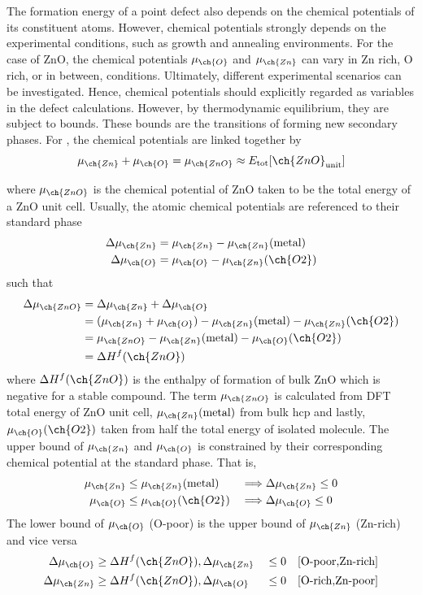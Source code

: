 The formation energy of a point defect also depends on the chemical potentials of its constituent atoms. However, chemical potentials strongly depends on the experimental conditions, such as growth and annealing environments. For the case of ZnO, the chemical potentials $\mu_{\ch{O}}$ and $\mu_{\ch{Zn}}$ can vary in Zn rich, O rich, or in between, conditions. Ultimately, different experimental scenarios can be investigated. Hence, chemical potentials should explicitly regarded as variables in the defect calculations.  However, by thermodynamic equilibrium, they are subject to bounds. These bounds are the transitions of forming new secondary phases. For , the chemical potentials are linked together by \citep{Freysoldt2014}
\begin{equation}
    \mu_{\ch{Zn}} +    \mu_{\ch{O}} =     \mu_{\ch{ZnO}} \approx E_{\text{tot}}[\ch{ZnO}_{\text{unit}}]
\end{equation}

where $\mu_{\ch{ZnO}}$ is the chemical potential of ZnO taken to be the total energy of a ZnO unit cell. Usually, the atomic chemical potentials are referenced to their standard phase
\begin{align}
    \Delta \mu_{\ch{Zn}} &= \mu_{\ch{Zn}} - \mu_{\ch{Zn}}(\text{metal}) \label{eq:del-mu_Zn} \\
    \Delta \mu_{\ch{O}}  &= \mu_{\ch{O}} - \mu_{\ch{Zn}}(\ch{O2}) \label{eq:del-mu_O}
\end{align}
such that 
\begin{align}
    \Delta \mu_{\ch{ZnO}} &= \Delta \mu_{\ch{Zn}} +   \Delta \mu_{\ch{O}} \\
    &= (\mu_{\ch{Zn}} + \mu_{\ch{O}}) - \mu_{\ch{Zn}}(\text{metal}) - \mu_{\ch{Zn}}(\ch{O2}) \\
    &= \mu_{\ch{ZnO}} - \mu_{\ch{Zn}}(\text{metal}) - \mu_{\ch{O}}(\ch{O2}) \\
    &= \Delta H^f (\ch{ZnO})
\end{align}
where $\Delta H^f (\ch{ZnO})$ is the enthalpy of formation of bulk ZnO which is negative for a stable compound. The term $\mu_{\ch{ZnO}}$ is calculated from DFT total energy of ZnO unit cell, $\mu_{\ch{Zn}}(\text{metal})$ from bulk hcp  and lastly, $\mu_{\ch{O}}(\ch{O2})$ taken from half the total energy of isolated  molecule. The upper bound of $\mu_{\ch{Zn}}$ and  $\mu_{\ch{O}}$ is constrained by their corresponding chemical potential at the standard phase. That is, 
\begin{alignat}{2}
    \mu_{\ch{Zn}} &\leq \mu_{\ch{Zn}}(\text{metal}) &&\Longrightarrow \Delta \mu_{\ch{Zn}} \leq 0 \\
    \mu_{\ch{O}} &\leq \mu_{\ch{O}}(\ch{O2}) &&\Longrightarrow \Delta \mu_{\ch{O}} \leq 0
\end{alignat}
The lower bound of $\mu_{\ch{O}}$ (O-poor) is the upper bound of $\mu_{\ch{Zn}}$ (Zn-rich) and vice versa
\begin{alignat}{2}
    \Delta \mu_{\ch{O}} &\geq \Delta H^f (\ch{ZnO}), \Delta \mu_{\ch{Zn}} &&\leq 0 \quad [\text{O-poor,Zn-rich}]\\ 
    \Delta \mu_{\ch{Zn}} &\geq \Delta H^f (\ch{ZnO}), \Delta \mu_{\ch{O}} &&\leq 0 \quad [\text{O-rich,Zn-poor}]
\end{alignat}

